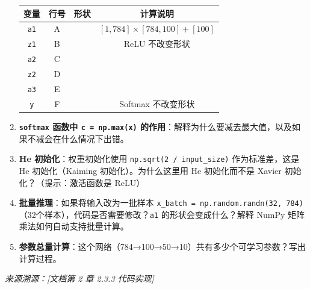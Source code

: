 \documentclass[a4paper,11pt]{ctexart}
\begin{document}
\begin{problembox}
\begin{enumerate}[(1)]
        \begin{center}
        \begin{tabular}{cccc}
            \toprule
            变量 & 行号 & 形状 & 计算说明 \\
            \midrule
            \texttt{a1} & A & \underline{\hspace{2.5cm}} & $[1,784] \times [784,100] + [100]$ \\
            \texttt{z1} & B & \underline{\hspace{2.5cm}} & ReLU 不改变形状 \\
            \texttt{a2} & C & \underline{\hspace{2.5cm}} & \underline{\hspace{4cm}} \\
            \texttt{z2} & D & \underline{\hspace{2.5cm}} & \underline{\hspace{4cm}} \\
            \texttt{a3} & E & \underline{\hspace{2.5cm}} & \underline{\hspace{4cm}} \\
            \texttt{y}  & F & \underline{\hspace{2.5cm}} & Softmax 不改变形状 \\
            \bottomrule
        \end{tabular}
        \end{center}

        \item \textbf{\texttt{softmax} 函数中 \texttt{c = np.max(x)} 的作用}：解释为什么要减去最大值，以及如果不减会在什么情况下出错。

        \item \textbf{He 初始化}：权重初始化使用 \texttt{np.sqrt(2 / input\_size)} 作为标准差，这是 He 初始化（Kaiming 初始化）。为什么这里用 He 初始化而不是 Xavier 初始化？（提示：激活函数是 ReLU）

        \item \textbf{批量推理}：如果将输入改为一批样本 \texttt{x\_batch = np.random.randn(32, 784)}（32个样本），代码是否需要修改？\texttt{a1} 的形状会变成什么？解释 NumPy 矩阵乘法如何自动支持批量计算。

        \item \textbf{参数总量计算}：这个网络（784→100→50→10）共有多少个可学习参数？写出计算过程。
    \end{enumerate}

    \vspace{0.2cm}
    {\color{gray}\small\textit{来源溯源：[文档第 2 章 2.3.3 代码实现]}}
\end{problembox}
\end{document}
